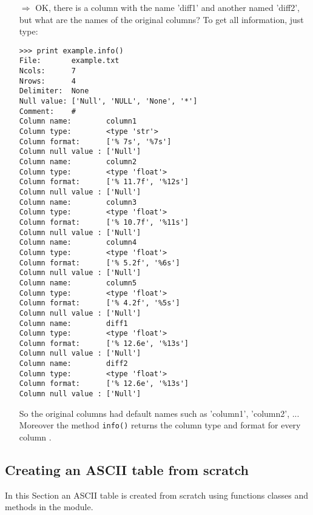 \begin{itemize}
\item[$\Rightarrow$] OK, there  is a column with the name 'diff1' and another
named 'diff2', but what are the names of the original columns?
To get all information, just type:
\begin{small}
\begin{verbatim}
>>> print example.info()
File:       example.txt
Ncols:      7
Nrows:      4
Delimiter:  None
Null value: ['Null', 'NULL', 'None', '*']
Comment:    #
Column name:        column1
Column type:        <type 'str'>
Column format:      ['% 7s', '%7s']
Column null value : ['Null']
Column name:        column2
Column type:        <type 'float'>
Column format:      ['% 11.7f', '%12s']
Column null value : ['Null']
Column name:        column3
Column type:        <type 'float'>
Column format:      ['% 10.7f', '%11s']
Column null value : ['Null']
Column name:        column4
Column type:        <type 'float'>
Column format:      ['% 5.2f', '%6s']
Column null value : ['Null']
Column name:        column5
Column type:        <type 'float'>
Column format:      ['% 4.2f', '%5s']
Column null value : ['Null']
Column name:        diff1
Column type:        <type 'float'>
Column format:      ['% 12.6e', '%13s']
Column null value : ['Null']
Column name:        diff2
Column type:        <type 'float'>
Column format:      ['% 12.6e', '%13s']
Column null value : ['Null']
\end{verbatim}
\end{small}
So the original columns had default names
such as 'column1', 'column2', ... Moreover the method 
\verb+info()+ returns the column
type and format for every column .
\end{itemize}

\subsection{Creating an ASCII table from scratch}
\label{creatingfromscratch}
In this Section an ASCII table is created from scratch using
functions classes and methods in the \AAD module.

